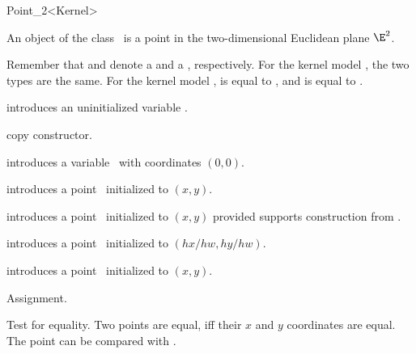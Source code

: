 \begin{ccRefClass} {Point_2<Kernel>}

\ccDefinition
An object of the class \ccRefName\ is a point in the two-dimensional
Euclidean plane $\E^2$. 

Remember that  and  denote a
 and a , respectively. For the kernel
model , the two types are the same. For the
kernel model ,  is equal
to , and  is equal to
.

\ccTypes
{}
\ccThreeToTwo


\ccCreation
{}


\ccHidden {}
             {introduces an uninitialized variable \ccVar.}

\ccHidden {}
            {copy constructor.}

            {introduces a variable \ccVar\ with  coordinates
              $(0,0)$.}

            {introduces a point \ccVar\ initialized to $(x,y)$.}

            {introduces a point \ccVar\ initialized to $(x,y)$
             provided  supports construction from .}

            {introduces a point \ccVar\ initialized to $(hx/hw,hy/hw)$.
              }

            {introduces a point \ccVar\ initialized to $(x,y)$.}


\ccOperations

\ccHidden {}
        {Assignment.}

       {Test for equality. Two points are equal, iff their $x$ and $y$ 
        coordinates are equal. The point can be compared with
                .}


\end{ccRefClass}
